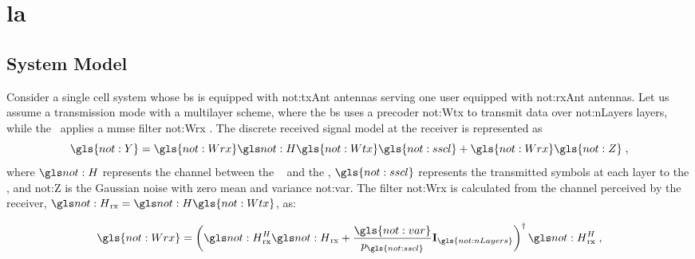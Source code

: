 \glsresetall
%

\chapter{\Acl{la}} \label{chp:la}




\section{System Model}
\label{sec:la-system-model}

Consider a single cell system whose \gls{bs} is equipped with \gls{not:txAnt} antennas serving one user equipped with \gls{not:rxAnt} antennas.
%
Let us assume a transmission mode with a multilayer scheme, where the \gls{bs} uses a precoder \gls{not:Wtx}  to transmit data over  \gls{not:nLayers} layers, while the \ue~applies a \gls{mmse} filter \gls{not:Wrx} .
%
The discrete received signal model at the receiver is represented as
\begin{equation}
\label{eq.:rx_signal}
\gls{not:Y} =
\gls{not:Wrx}
\channel
\gls{not:Wtx}
\gls{not:sscl}
+
\gls{not:Wrx}
\gls{not:Z} \;,
\end{equation}
\noindent where $\channel $  represents the channel between the \base~ and the \ue, $\gls{not:sscl}$ represents the transmitted symbols at each layer to the \ue, and \gls{not:Z} is the Gaussian noise with zero mean and variance \gls{not:var}.
%
The filter \gls{not:Wrx} is calculated from the channel perceived by the receiver, $\channel_{\textrm{rx}} = \channel \gls{not:Wtx}$, as:

\begin{equation}
\label{eq.:Wrx}
\gls{not:Wrx} =
\left(
\channel_{\textrm{rx}}^H
\channel_{\textrm{rx}}
+
\frac{ \gls{not:var} }{ p_{\gls{not:sscl}} }
\mathbf{I}_{\gls{not:nLayers}} \right)^\dagger
\channel_{\textrm{rx}}^H \;,
\end{equation}

